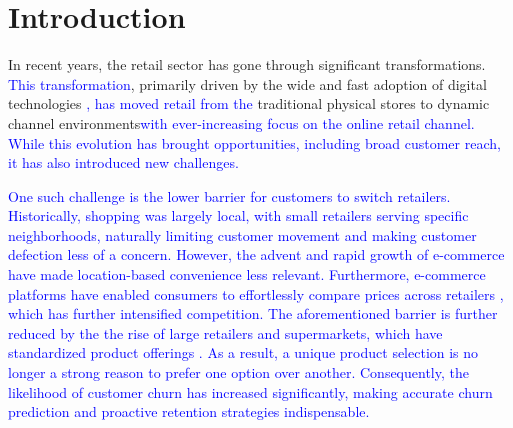 \documentclass[preprint,12pt]{elsarticle}
\begin{document}

\section{Introduction}
\label{sec:introduction}



In recent years, the retail sector has gone through significant transformations. \textcolor{blue}{This transformation}, primarily driven by the wide and fast adoption of digital technologies \cite{REINARTZ2019350}\textcolor{blue}{, has moved retail from the} traditional physical stores to dynamic channel environments\textcolor{blue}{with ever-increasing focus on the online retail channel. While this evolution has brought opportunities, including broad customer reach, it has also introduced new challenges.}

\textcolor{blue}{One such challenge is the lower barrier for customers to switch retailers. 
Historically, shopping was largely local, with small retailers serving specific neighborhoods, naturally limiting customer movement and making customer defection less of a concern. However, the advent and rapid growth of e-commerce have made location-based convenience less relevant. Furthermore, e-commerce platforms have enabled consumers to effortlessly compare prices across retailers \cite{matuszelanski2022customer, Digitalization-of-retailing-Hagberg}, which has further intensified competition. The aforementioned barrier is further reduced by the the rise of large retailers and supermarkets, which have standardized product offerings \cite{basker2012supersize, Reinartz2003TheIO}. As a result, a unique product selection is no longer a strong reason to prefer one option over another. Consequently, the likelihood of customer churn has increased significantly, making accurate churn prediction and proactive retention strategies indispensable.}
\end{document}
